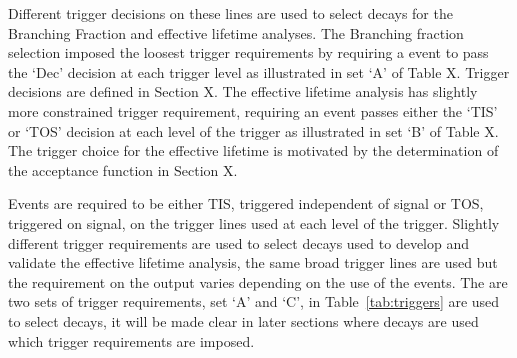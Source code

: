 Different trigger decisions on these lines are used to select decays for the Branching Fraction and effective lifetime analyses. The Branching fraction selection imposed the loosest trigger requirements by requiring a event to pass the `Dec' decision at each trigger level as illustrated in set `A' of Table X. Trigger decisions are defined in Section X. The effective lifetime analysis has slightly more constrained trigger requirement, requiring an event passes either the `TIS' or `TOS' decision at each level of the trigger as illustrated in set `B' of Table X. The trigger choice for the effective lifetime is motivated by the determination of the acceptance function in Section X. 

Events are required to be either TIS, triggered independent of signal or TOS, triggered on signal, on the trigger lines used at each level of the trigger.
Slightly different trigger requirements are used to select \bhh decays used to develop and validate the effective lifetime analysis, the same broad trigger lines are used but the requirement on the output varies depending on the use of the \bhh events. The are two sets of trigger requirements, set `A' and `C', in Table~\ref{tab:triggers} are used to select \bhh decays, it will be made clear in later sections where \bhh decays are used which trigger requirements are imposed. 

